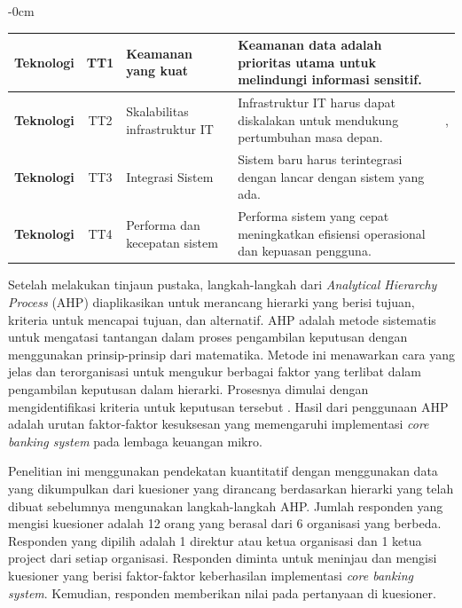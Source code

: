 \documentclass[journal,article,submit,pdftex,moreauthors]{Definitions/mdpi}
\begin{document}
\begin{table}[H]
\begin{adjustwidth}{-\extralength}{0cm}
\begin{tabular}{c|c|p{4cm}|p{6cm}|c}
        \textbf{Teknologi} & TT1 & \raggedright Keamanan yang kuat & \raggedright Keamanan data adalah prioritas utama untuk melindungi informasi sensitif. & \cite{falisat-csf} \\ 
        \midrule
        \textbf{Teknologi} & TT2 & \raggedright Skalabilitas infrastruktur IT & \raggedright Infrastruktur IT harus dapat diskalakan untuk mendukung pertumbuhan masa depan. & \cite{Ghafari-csf}, \cite{salu-csf} \\ 
        \midrule
        \textbf{Teknologi} & TT3 & \raggedright Integrasi Sistem & \raggedright Sistem baru harus terintegrasi dengan lancar dengan sistem yang ada. & \cite{Ghafari-csf} \\ 
        \midrule
        \textbf{Teknologi} & TT4 & \raggedright Performa dan kecepatan sistem & \raggedright Performa sistem yang cepat meningkatkan efisiensi operasional dan kepuasan pengguna. & \cite{Ghafari-csf} \\ 
        \bottomrule
    \end{tabular}
\end{adjustwidth}
\end{table}


Setelah melakukan tinjaun pustaka, langkah-langkah dari \textit{Analytical Hierarchy Process} (AHP) diaplikasikan untuk merancang hierarki yang berisi tujuan, kriteria untuk mencapai tujuan, dan alternatif. AHP adalah metode sistematis untuk mengatasi tantangan dalam proses pengambilan keputusan dengan menggunakan prinsip-prinsip dari matematika. Metode ini menawarkan cara yang jelas dan terorganisasi untuk mengukur berbagai faktor yang terlibat dalam pengambilan keputusan dalam hierarki. Prosesnya dimulai dengan mengidentifikasi kriteria untuk keputusan tersebut \cite{Tavana2021AnalyticalHP}. Hasil dari penggunaan AHP adalah urutan faktor-faktor kesuksesan yang memengaruhi implementasi \textit{core banking system} pada lembaga keuangan mikro.

Penelitian ini menggunakan pendekatan kuantitatif dengan menggunakan data yang dikumpulkan dari kuesioner yang dirancang berdasarkan hierarki yang telah dibuat sebelumnya mengunakan langkah-langkah AHP. Jumlah responden yang mengisi kuesioner adalah 12 orang yang berasal dari 6 organisasi yang berbeda. Responden yang dipilih adalah 1 direktur atau ketua organisasi dan 1 ketua project dari setiap organisasi. Responden diminta untuk meninjau dan mengisi kuesioner yang berisi faktor-faktor keberhasilan implementasi \textit{core banking system}. Kemudian, responden memberikan nilai pada pertanyaan di kuesioner. 
\end{document}
